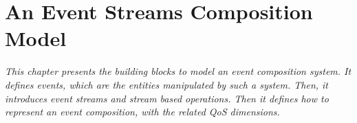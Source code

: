 \chapter{An Event Streams Composition Model}
\label{ch3}
\textit{This chapter presents the building blocks to model an event composition system. It defines events, which are the entities manipulated by such a system. Then, it introduces event 
streams and stream based operations. Then it defines how to represent an event composition, with the related QoS dimensions.}
\vspace{5cm}
\vspace{2ex}\vfill
\minitoc


